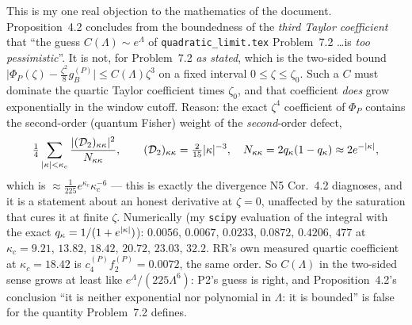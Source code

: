 \documentclass[11pt]{article}
\begin{document}
\begin{verdictbreak}
This is my one real objection to the mathematics of the document.  Proposition~4.2 concludes from
the boundedness of the \emph{third Taylor coefficient} that ``the guess $C(\Lambda)\sim e^\Lambda$
of \texttt{quadratic\_limit.tex} Problem~7.2 \ldots is \emph{too pessimistic}''.  It is not, for
Problem~7.2 \emph{as stated}, which is the two-sided bound
$\bigl|\Phi_P(\zeta)-\frac{\zeta^2}8g_B^{(P)}\bigr|\le C(\Lambda)\zeta^3$ on a fixed interval
$0\le\zeta\le\zeta_0$.  Such a $C$ must dominate the quartic Taylor coefficient times $\zeta_0$, and
that coefficient \emph{does} grow exponentially in the window cutoff.  Reason: the exact
$\zeta^4$ coefficient of $\Phi_P$ contains the second-order (quantum Fisher) weight of the
\emph{second}-order defect,
\[
 \tfrac14\sum_{\lvert\kappa\rvert<\kappa_c}\frac{\lvert(\mathcal D_2)_{\kappa\kappa}\rvert^2}{N_{\kappa\kappa}},
 \qquad (\mathcal D_2)_{\kappa\kappa}=\tfrac2{15}\lvert\kappa\rvert^{-3},\quad
 N_{\kappa\kappa}=2q_\kappa(1-q_\kappa)\approx2e^{-\lvert\kappa\rvert},
\]
which is $\approx\frac1{225}e^{\kappa_c}\kappa_c^{-6}$ --- this is exactly the divergence N5
Cor.~4.2 diagnoses, and it is a statement about an honest derivative at $\zeta=0$, unaffected by the
saturation that cures it at finite $\zeta$.  Numerically (my \texttt{scipy} evaluation of the
integral with the exact $q_\kappa=1/(1+e^{\lvert\kappa\rvert})$): $0.0056,\,0.0067,\,0.0233,\,0.0872,
\,0.4206,\,477$ at $\kappa_c=9.21,\,13.82,\,18.42,\,20.72,\,23.03,\,32.2$.  RR's own measured
quartic coefficient at $\kappa_c=18.42$ is $c_4^{(P)}f_2^{(P)}=0.0072$, the same order.  So
$C(\Lambda)$ in the two-sided sense grows at least like $e^\Lambda/(225\Lambda^6)$: P2's guess is
right, and Proposition~4.2's conclusion ``it is neither exponential nor polynomial in $\Lambda$: it
is bounded'' is false for the quantity Problem~7.2 defines.
\end{verdictbreak}
\end{document}
